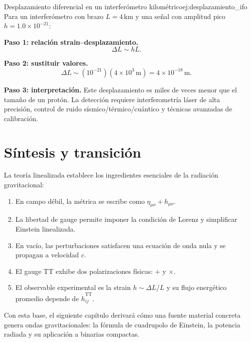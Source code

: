 \begin{ejemplo}{Desplazamiento diferencial en un interferómetro kilométrico}{ej:desplazamiento_ifo}
Para un interferómetro con brazo $L=4\,\mathrm{km}$ y una señal con amplitud pico $h=1.0\times10^{-21}$:

\textbf{Paso 1: relación strain--desplazamiento.}
\begin{equation}
  \Delta L \sim hL.
\end{equation}

\textbf{Paso 2: sustituir valores.}
\begin{equation}
  \Delta L \sim (10^{-21})(4\times10^3\,\mathrm{m})=4\times10^{-18}\,\mathrm{m}.
\end{equation}

\textbf{Paso 3: interpretación.}
Este desplazamiento es miles de veces menor que el tamaño de un protón. La detección requiere interferometría láser de alta precisión, control de ruido sísmico/térmico/cuántico y técnicas avanzadas de calibración.
\end{ejemplo}

\section{Síntesis y transición}
\label{sec:sintesis_cap15}

La teoría linealizada establece los ingredientes esenciales de la radiación gravitacional:
\begin{enumerate}[leftmargin=2em, label=\textbf{\arabic*.}]
  \item En campo débil, la métrica se escribe como $\eta_{\mu\nu}+h_{\mu\nu}$.
  \item La libertad de gauge permite imponer la condición de Lorenz y simplificar Einstein linealizada.
  \item En vacío, las perturbaciones satisfacen una ecuación de onda nula y se propagan a velocidad $c$.
  \item El gauge TT exhibe dos polarizaciones físicas: $+$ y $\times$.
  \item El observable experimental es la strain $h\sim\Delta L/L$ y su flujo energético promedio depende de $\dot h_{ij}^{\mathrm{TT}}$.
\end{enumerate}

Con esta base, el siguiente capítulo derivará cómo una fuente material concreta genera ondas gravitacionales: la fórmula de cuadrupolo de Einstein, la potencia radiada y su aplicación a binarias compactas.

